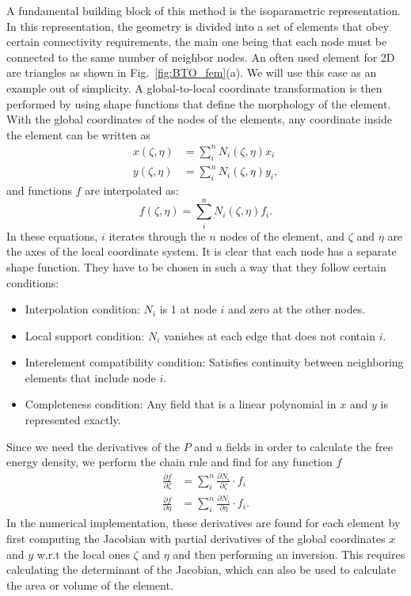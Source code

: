 A fundamental building block of this method is the isoparametric representation.
In this representation, the geometry is divided into a set of elements that obey certain connectivity requirements, the main one being that each node must be connected to the same number of neighbor nodes.
An often used element for 2D are triangles as shown in Fig.~\ref{fig:BTO_fem}(a).
We will use this case as an example out of simplicity.
A global-to-local coordinate transformation is then performed by using shape functions that define the morphology of the element.
With the global coordinates of the nodes of the elements, any coordinate inside the element can be written as
\begin{align}
x(\zeta, \eta) &= \sum_i^n N_i(\zeta, \eta) x_i\\
y(\zeta, \eta) &= \sum_i^n N_i(\zeta, \eta) y_i,
\end{align}
and functions $f$ are interpolated as:
\begin{equation}
	f(\zeta, \eta) = \sum_i^n N_i(\zeta, \eta) f_i.
\end{equation}
In these equations, $i$ iterates through the $n$ nodes of the element, and $\zeta$ and $\eta$ are the axes of the local coordinate system.
It is clear that each node has a separate shape function.
They have to be chosen in such a way that they follow certain conditions:
\begin{itemize}
	\item Interpolation condition: $N_i$ is 1 at node $i$ and zero at the other nodes.
	\item Local support condition: $N_i$ vanishes at each edge that does not contain $i$.
	\item Interelement compatibility condition: Satisfies continuity between neighboring elements that include node $i$.
	\item Completeness condition: Any field that is a linear polynomial in $x$ and $y$ is represented exactly.
\end{itemize}

Since we need the derivatives of the $P$ and $u$ fields in order to calculate the free energy density, we perform the chain rule and find for any function $f$
\begin{align}
	\label{eq:BTO_derivatives}
	\frac{\partial f}{\partial \zeta} &= \sum_i^n \frac{\partial N_i}{\partial \zeta} \cdot f_i \\
	\frac{\partial f}{\partial \eta}  &= \sum_i^n \frac{\partial N_i}{\partial \eta} \cdot f_i.
\end{align}
In the numerical implementation, these derivatives are found for each element by first computing the Jacobian with partial derivatives of the global coordinates $x$ and $y$ w.r.t the local ones $\zeta$ and $\eta$ and then performing an inversion.
This requires calculating the determinant of the Jacobian, which can also be used to calculate the area or volume of the element.

